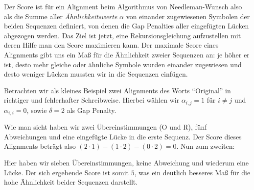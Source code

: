 Der Score ist für ein Alignment beim Algorithmus von Needleman-Wunsch also als die Summe aller \emph{Ähnlichkeitswerte} $\alpha$ von einander zugewiesenen Symbolen der beiden Sequenzen definiert, von denen die Gap Penalties aller eingefügten Lücken abgezogen werden. Das Ziel ist jetzt, eine Rekursionsgleichung aufzustellen mit deren Hilfe man den Score maximieren kann. Der maximale Score eines Alignments gibt uns ein Maß für die Ähnlichkeit zweier Sequenzen an: je höher er ist, desto mehr gleiche oder ähnliche Symbole wurden einander zugewiesen und desto weniger Lücken mussten wir in die Sequenzen einfügen.

\begin{beispiel}
	Betrachten wir als kleines Beispiel zwei Alignments des Worts \enquote{Original} in richtiger und fehlerhafter Schreibweise. Hierbei wählen wir $\alpha_{i,j} = 1$ für $i \neq j$ und $\alpha_{i,i} = 0$, sowie $\delta = 2$ als Gap Penalty.
	
	\footnotesize
	\begin{center}
	\end{center}
	\normalsize
	
	Wie man sieht haben wir zwei Übereinstimmungen (O und R), fünf Abweichungen und eine eingefügte Lücke in die erste Sequenz. Der Score dieses Alignments beträgt also $(2\cdot 1)-(1\cdot 2)-(0\cdot 2) = 0$. Nun zum zweiten:
	
	\footnotesize
	\begin{center}
	\end{center}
	\normalsize
	
	Hier haben wir sieben Übereinstimmungen, keine Abweichung und wiederum eine Lücke. Der sich ergebende Score ist somit $5$, was ein deutlich besseres Maß für die hohe Ähnlichkeit beider Sequenzen darstellt.
\end{beispiel}

